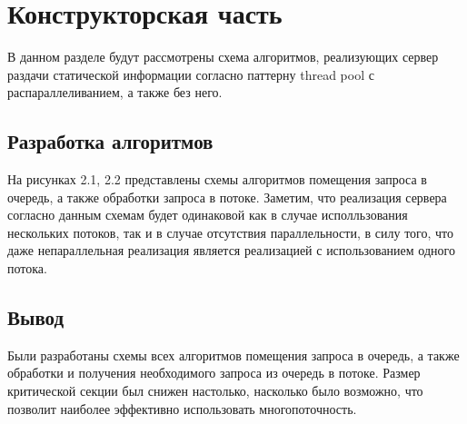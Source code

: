\chapter{Конструкторская часть}
В данном разделе будут рассмотрены схема алгоритмов, реализующих сервер раздачи статической информации согласно паттерну thread pool с распараллеливанием, а также без него.

\section{Разработка алгоритмов}
На рисунках 2.1, 2.2 представлены схемы алгоритмов помещения запроса в очередь, а также обработки запроса в потоке.
Заметим, что реализация сервера согласно данным схемам будет одинаковой как в случае исполльзования нескольких потоков, так и в случае отсутствия параллельности, в силу того, что даже непараллельная реализация является реализацией с использованием одного потока.

\clearpage

\section*{Вывод}

Были разработаны схемы всех алгоритмов помещения запроса в очередь, а также обработки и получения необходимого запроса из очередь в потоке. Размер критической секции был снижен настолько, насколько было возможно, что позволит наиболее эффективно использовать многопоточность.

